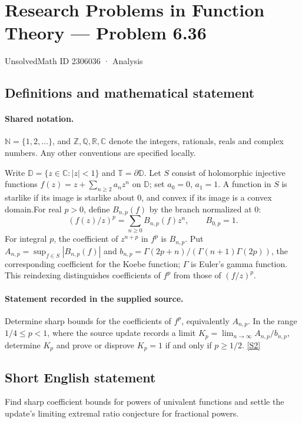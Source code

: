 \documentclass[11pt]{article}
\newcommand{\sref}[2]{\hyperlink{source:#1:#2}{[S#2]}}
\begin{document}
\setcounter{section}{2306035}
\section{Research Problems in Function Theory — Problem 6.36}\label{2306036}
{\small\sffamily UnsolvedMath ID 2306036 · Analysis}
\subsection{Definitions and mathematical statement}

\paragraph{Shared notation.}$\mathbb N=\{1,2,\ldots\}$, and $\mathbb Z,\mathbb Q,\mathbb R,\mathbb C$ denote the integers, rationals, reals and complex numbers. Any other conventions are specified locally.


Write $\mathbb D=\{z\in\mathbb C:|z|<1\}$ and $\mathbb T=\partial\mathbb D$. Let $S$ consist of holomorphic injective functions $f(z)=z+\sum_{n\ge2}a_nz^n$ on $\mathbb D$; set $a_0=0$, $a_1=1$. A function in $S$ is starlike if its image is starlike about $0$, and convex if its image is a convex domain.For real $p>0$, define $B_{n,p}(f)$ by the branch normalized at $0$:
\[(f(z)/z)^p=\sum_{n\ge0}B_{n,p}(f)z^n,\qquad B_{0,p}=1.\]
For integral $p$, the coefficient of $z^{n+p}$ in $f^p$ is $B_{n,p}$. Put $A_{n,p}=\sup_{f\in S}|B_{n,p}(f)|$ and $b_{n,p}=\Gamma(2p+n)/(\Gamma(n+1)\Gamma(2p))$, the corresponding coefficient for the Koebe function; $\Gamma$ is Euler's gamma function. This reindexing distinguishes coefficients of $f^p$ from those of $(f/z)^p$.
\paragraph{Statement recorded in the supplied source.}
Determine sharp bounds for the coefficients of $f^p$, equivalently $A_{n,p}$. In the range $1/4\le p<1$, where the source update records a limit $K_p=\lim_{n\to\infty}A_{n,p}/b_{n,p}$, determine $K_p$ and prove or disprove $K_p=1$ if and only if $p\ge1/2$. \sref{2306036}{2}
\subsection{Short English statement}
Find sharp coefficient bounds for powers of univalent functions and settle the update’s limiting extremal ratio conjecture for fractional powers.
\end{document}
